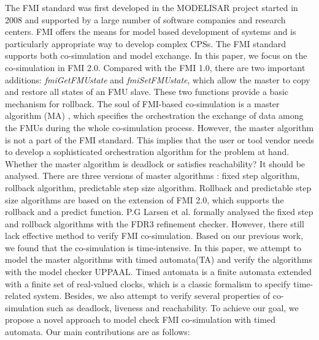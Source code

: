 The FMI standard was first developed in the MODELISAR project started in 2008 and supported by a large number of software companies and research centers. FMI offers the means for model based development of systems and is particularly appropriate way to develop complex CPSs. The FMI standard supports both co-simulation and  model exchange. In this paper, we focus on the co-simulation in FMI 2.0. Compared with the FMI 1.0, there are two important additions: \emph{fmiGetFMUstate} and \emph{fmiSetFMUstate}, which allow the master to copy and restore all states of an FMU slave. These two functions provide a basic mechanism for rollback. 
The soul of FMI-based co-simulation is a master algorithm (MA) \cite{AckerDVM15}, which specifies the orchestration the exchange of data among the FMUs during the whole co-simulation process. However, the master algorithm is not a part of the FMI standard. This implies that the user or tool vendor needs to develop a sophisticated orchestration algorithm for the problem at hand. Whether the master algorithm is deadlock or satisfies reachability? It should be analysed. There are three versions of master algorithms \cite{BromanBGLMTW13}: fixed step algorithm, rollback algorithm, predictable step size algorithm. Rollback and predictable step size algorithms are based on the extension of FMI 2.0, which supports the rollback and a predict function. P.G Larsen et al. \cite{Larsen2016Integrated} formally analysed the fixed step and rollback algorithms with the FDR3 refinement checker. However, there still lack  
effective method to verify FMI co-simulation. Based on our previous work, we found that the co-simulation is time-intensive. In this paper, we attempt to model the master algorithms with timed automata(TA) \cite{BehrmannDLHPYH06} and verify the algorithms with the model checker UPPAAL. Timed automata is a finite automata extended with a finite set of real-valued clocks, which is a classic formalism to specify time-related system. Besides, we also attempt to verify several properties of co-simulation such as deadlock, liveness and reachability. To achieve our goal, we propose a novel approach to model check FMI co-simulation with timed automata.
Our main contributions are as follows:
